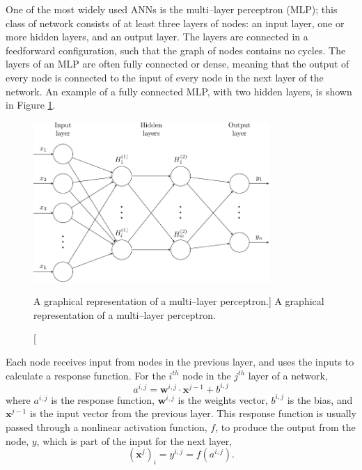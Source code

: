 One of the most widely used ANNs is the multi--layer perceptron 
(MLP)\cite{Reed1999}; this class of network consists of at least three layers 
of nodes: an input layer, one or more hidden layers, and an output layer. The 
layers are connected in a feedforward configuration, such that the graph of 
nodes contains no cycles. The layers of an MLP are often fully connected or 
dense, meaning that the output of every node is connected to the input of 
every node in the next layer of the network. An example of a fully connected 
MLP, with two hidden layers, is shown in Figure \ref{fig:mlp}. 
\begin{figure}

	\centering

	\includegraphics[width = 0.8\textwidth]{figures/mlp.pdf}

	\caption
	[A graphical representation of a multi--layer perceptron.]
	{ A graphical representation of a multi--layer perceptron. }

	\label{fig:mlp}

\end{figure}

Each node receives input from nodes in the previous layer, and uses the inputs
to calculate a response function. For the $i^{th}$ node in the $j^{th}$ layer 
of a network, 
\begin{equation*}
	a^{i,j} = \mathbf{w}^{i,j} \cdot \mathbf{x}^{j-1} + b^{i,j}
\end{equation*}
where $a^{i,j}$ is the response function, $\mathbf{w}^{i,j}$ is the weights
vector, $b^{i,j}$ is the bias, and $\mathbf{x}^{j-1}$ is the input vector from 
the previous layer. This response function is usually passed through a
nonlinear activation function, $f$, to produce the output from the node,
$y$, which is part of the input for the next layer,
\begin{equation*}
	\left(\mathbf{x}^j\right)_i = y^{i,j} = f \left( a^{i,j} \right).
\end{equation*}

